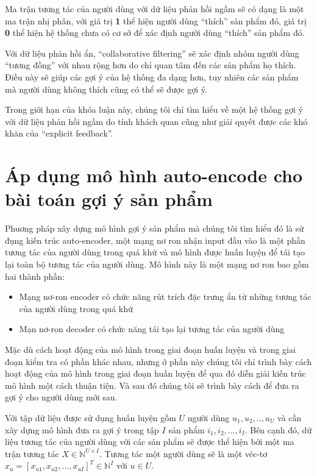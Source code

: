     Ma trận tương tác của người dùng với dữ liệu phản hồi ngầm sẽ có dạng là một ma trận nhị phân, với giá trị \textbf{1} 
    thể hiện người dùng ``thích'' sản phẩm đó, giá trị \textbf{0} thể hiện hệ thống chưa có cơ sở để xác định người dùng ``thích'' sản phẩm đó.

    Với dữ liệu phản hồi ẩn, ``collaborative filtering'' sẽ xác định nhóm người dùng ``tương đồng'' với nhau rộng hơn
    do chỉ quan tâm đến các sản phẩm họ thích. Điều này sẽ giúp các gợi ý của hệ thống 
    đa dạng hơn, tuy nhiên các sản phẩm mà người dùng không thích cũng có thể sẽ được gợi ý.

    Trong giới hạn của khóa luận này, chúng tôi chỉ tìm hiểu về một hệ thống gợi ý với dữ liệu phản hồi ngầm do tính khách quan
    cũng như giải quyết được các khó khăn của ``explicit feedback''.

\section{Áp dụng mô hình auto-encode cho bài toán gợi ý sản phẩm}
    Phuơng pháp xây dựng mô hình gợi ý sản phẩm mà chúng tôi tìm hiểu đó là sử đụng kiến trúc auto-encoder, một mạng nơ ron nhận input đầu vào là một phần tương tác của người dùng trong quá khứ và mô hình được huấn luyện để tái tạo lại toàn bộ tương tác của người dùng.  Mô hình này là một mạng nơ ron bao gồm hai thành phần:
    \begin{itemize}
        \item Mạng nơ-ron encoder có chức năng rút trích đặc trưng ẩn từ những tương tác của người dùng trong quá khứ
        \item Mạn nơ-ron decoder có chức năng tái tạo lại tương tác của người dùng
    \end{itemize}

    Mặc dù cách hoạt động của mô hình trong giai đoạn huấn luyện và trong giai đoạn kiểm tra có phần khác nhau, nhưng ở phần này chúng tôi chỉ trình bày cách hoạt động của mô hình trong giai đoạn huấn luyện để qua đó diễn giải kiến trúc mô hình một cách thuận tiện. Và sau đó chúng tôi sẽ trình bày cách để đưa ra gợi ý cho người dùng mới sau.

    Với tập dữ liệu được sử dụng huấn luyện gồm $U$ người dùng ${u_1,u_2, .., u_U}$ và cần xây dựng mô hình đưa ra gợi ý trong tập $I$ sản phẩm ${i_1,i_2, ..., i_I}$. Bên cạnh đó, dữ liệu tương tác của người dùng với các sản phẩm sẽ được thể hiện bởi một ma trận tương tác $X \in \mathbb{N}^{U\times I}$. Tương tác một người dùng sẽ là một véc-tơ $x_u = [x_{u1}, x_{u2}, ..., x_{uI}]^T \in \mathbb{N}^I $ với $u \in U$.
    
